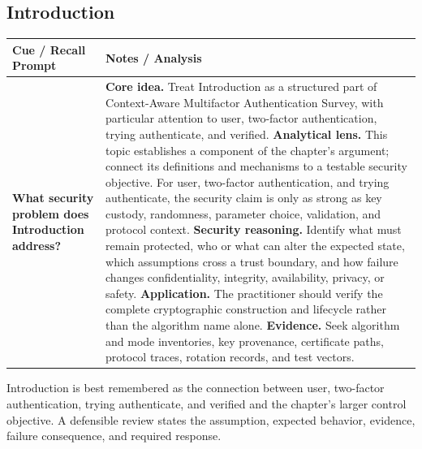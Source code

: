 \documentclass[11pt]{article}
\newcommand{\CornellHeader}{%
\rowcolor{Navy}\color{white}\bfseries Cue / Recall Prompt & \color{white}\bfseries Notes / Analysis\\\hline}
\newcommand{\CornellRow}[2]{%
\cellcolor{CueGray}\RaggedRight\textbf{#1} & \RaggedRight #2\\\hline}
\begin{document}
\subsection*{Introduction}
\begin{longtable}{>{\RaggedRight\arraybackslash}p{}|>{\RaggedRight\arraybackslash}p{}}
\CornellHeader
\CornellRow{What security problem does Introduction address?}{\textbf{Core idea.} Treat Introduction as a structured part of Context-Aware Multifactor Authentication Survey, with particular attention to user, two-factor authentication, trying authenticate, and verified. \textbf{Analytical lens.} This topic establishes a component of the chapter's argument; connect its definitions and mechanisms to a testable security objective. For user, two-factor authentication, and trying authenticate, the security claim is only as strong as key custody, randomness, parameter choice, validation, and protocol context. \textbf{Security reasoning.} Identify what must remain protected, who or what can alter the expected state, which assumptions cross a trust boundary, and how failure changes confidentiality, integrity, availability, privacy, or safety. \textbf{Application.} The practitioner should verify the complete cryptographic construction and lifecycle rather than the algorithm name alone. \textbf{Evidence.} Seek algorithm and mode inventories, key provenance, certificate paths, protocol traces, rotation records, and test vectors.}
\end{longtable}
\begin{topicsummary}
Introduction is best remembered as the connection between user, two-factor authentication, trying authenticate, and verified and the chapter's larger control objective. A defensible review states the assumption, expected behavior, evidence, failure consequence, and required response.
\end{topicsummary}
\end{document}
